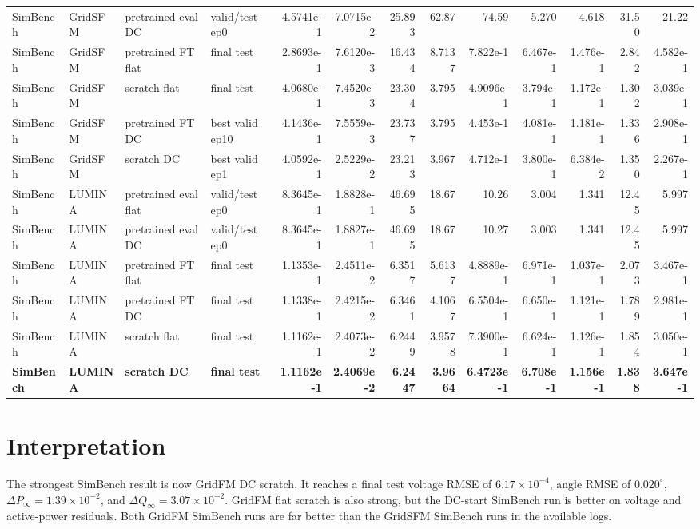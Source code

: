 \documentclass[10pt]{article}
\begin{document}
\begin{landscape}
\begin{table}[p]
{\begin{tabular}{llllrrrrrrrrr}
SimBench & GridSFM & pretrained eval DC & valid/test ep0 & 4.5741e-1 & 7.0715e-2 & 25.893 & 62.87 & 74.59 & 5.270 & 4.618 & 31.50 & 21.22 \\
SimBench & GridSFM & pretrained FT flat & final test & 2.8693e-1 & 7.6120e-3 & 16.434 & 8.7137 & 7.822e-1 & 6.467e-1 & 1.476e-1 & 2.842 & 4.582e-1 \\
SimBench & GridSFM & scratch flat & final test & 4.0680e-1 & 7.4520e-3 & 23.304 & 3.795 & 4.9096e-1 & 3.794e-1 & 1.172e-1 & 1.302 & 3.039e-1 \\
SimBench & GridSFM & pretrained FT DC & best valid ep10 & 4.1436e-1 & 7.5559e-3 & 23.737 & 3.795 & 4.453e-1 & 4.081e-1 & 1.181e-1 & 1.336 & 2.908e-1 \\
SimBench & GridSFM & scratch DC & best valid ep1 & 4.0592e-1 & 2.5229e-2 & 23.213 & 3.967 & 4.712e-1 & 3.800e-1 & 6.384e-2 & 1.350 & 2.267e-1 \\
SimBench & LUMINA & pretrained eval flat & valid/test ep0 & 8.3645e-1 & 1.8828e-1 & 46.695 & 18.67 & 10.26 & 3.004 & 1.341 & 12.45 & 5.997 \\
SimBench & LUMINA & pretrained eval DC & valid/test ep0 & 8.3645e-1 & 1.8827e-1 & 46.695 & 18.67 & 10.27 & 3.003 & 1.341 & 12.45 & 5.997 \\
SimBench & LUMINA & pretrained FT flat & final test & 1.1353e-1 & 2.4511e-2 & 6.3517 & 5.6137 & 4.8889e-1 & 6.971e-1 & 1.037e-1 & 2.073 & 3.467e-1 \\
SimBench & LUMINA & pretrained FT DC & final test & 1.1338e-1 & 2.4215e-2 & 6.3461 & 4.1067 & 6.5504e-1 & 6.650e-1 & 1.121e-1 & 1.789 & 2.981e-1 \\
SimBench & LUMINA & scratch flat & final test & 1.1162e-1 & 2.4073e-2 & 6.2449 & 3.9578 & 7.3900e-1 & 6.624e-1 & 1.126e-1 & 1.854 & 3.050e-1 \\
\textbf{SimBench} & \textbf{LUMINA} & \textbf{scratch DC} & \textbf{final test} & \textbf{1.1162e-1} & \textbf{2.4069e-2} & \textbf{6.2447} & \textbf{3.9664} & \textbf{6.4723e-1} & \textbf{6.708e-1} & \textbf{1.156e-1} & \textbf{1.838} & \textbf{3.647e-1} \\
\bottomrule
\end{tabular}
}
\end{table}
\end{landscape}

\section*{Interpretation}
The strongest SimBench result is now GridFM DC scratch. It reaches a final test voltage RMSE of \(6.17\times10^{-4}\), angle RMSE of \(0.020^\circ\), \(\Delta P_\infty=1.39\times10^{-2}\), and \(\Delta Q_\infty=3.07\times10^{-2}\). GridFM flat scratch is also strong, but the DC-start SimBench run is better on voltage and active-power residuals. Both GridFM SimBench runs are far better than the GridSFM SimBench runs in the available logs.
\end{document}
